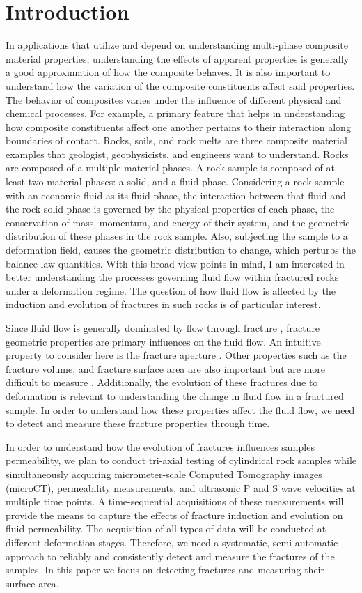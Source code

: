 \documentclass{edger}
\begin{document}
\section{Introduction}
In applications that utilize and depend on understanding multi-phase composite material properties, understanding the effects of apparent properties is generally a good approximation of how the composite behaves. It is also important to understand how the variation of the composite constituents affect said properties. The behavior of composites varies under the influence of different physical and chemical processes. For example, a primary feature that helps in understanding how composite constituents affect one another pertains to their interaction along boundaries of contact. Rocks, soils, and rock melts are three composite material examples that geologist, geophysicists, and engineers want to understand. Rocks are composed of a multiple material phases. A rock sample is composed of at least two material phases: a solid, and a fluid phase. Considering a rock sample with an economic fluid as its fluid phase, the interaction between that fluid and the rock solid phase is governed by the physical properties of each phase, the conservation of mass, momentum, and energy of their system, and the geometric distribution of these phases in the rock sample. Also, subjecting the sample to a deformation field, causes the geometric distribution to change, which perturbs the balance law quantities. With this broad view points in mind, I am interested in better understanding the processes governing fluid flow within fractured rocks under a deformation regime. The question of how fluid flow is affected by the induction and evolution of fractures in such rocks is of particular interest. 

Since fluid flow is generally dominated by flow through fracture \citep{Zoback2007}, fracture geometric properties are primary influences on the fluid flow. An intuitive property to consider here is the fracture aperture \citep{Zimmerman1996}. Other properties such as the fracture volume, and fracture surface area are also important but are more difficult to measure \citep{Zhao2020}.  Additionally, the evolution of these fractures due to deformation is relevant to understanding the change in fluid flow in a fractured sample. In order to understand how these properties affect the fluid flow, we need to detect and measure these fracture properties through time.

In order to understand how the evolution of fractures influences samples permeability, we plan to conduct tri-axial testing of cylindrical rock samples while simultaneously acquiring micrometer-scale Computed Tomography images (microCT), permeability measurements, and ultrasonic P and S wave velocities at multiple time points. A time-sequential acquisitions of these measurements will provide the means to capture the effects of fracture induction and evolution on fluid permeability. The acquisition of all types of data will be conducted at different deformation stages. Therefore, we need a systematic, semi-automatic approach to reliably and consistently detect and measure the fractures of the samples. In this paper we focus on detecting fractures and measuring their surface area. 
\end{document}
